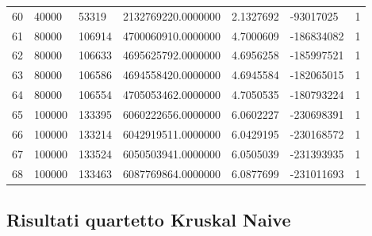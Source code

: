 \begin{longtable}{lllllll}
    60               & 40000          & 53319          & 2132769220.0000000 & 2.1327692        & -93017025       & 1                    \\
    61               & 80000          & 106914         & 4700060910.0000000 & 4.7000609        & -186834082      & 1                    \\
    62               & 80000          & 106633         & 4695625792.0000000 & 4.6956258        & -185997521      & 1                    \\
    63               & 80000          & 106586         & 4694558420.0000000 & 4.6945584        & -182065015      & 1                    \\
    64               & 80000          & 106554         & 4705053462.0000000 & 4.7050535        & -180793224      & 1                    \\
    65               & 100000         & 133395         & 6060222656.0000000 & 6.0602227        & -230698391      & 1                    \\
    66               & 100000         & 133214         & 6042919511.0000000 & 6.0429195        & -230168572      & 1                    \\
    67               & 100000         & 133524         & 6050503941.0000000 & 6.0505039        & -231393935      & 1                    \\
    68               & 100000         & 133463         & 6087769864.0000000 & 6.0877699        & -231011693      & 1                   
    \end{longtable}

\subsection{Risultati quartetto Kruskal Naive}

